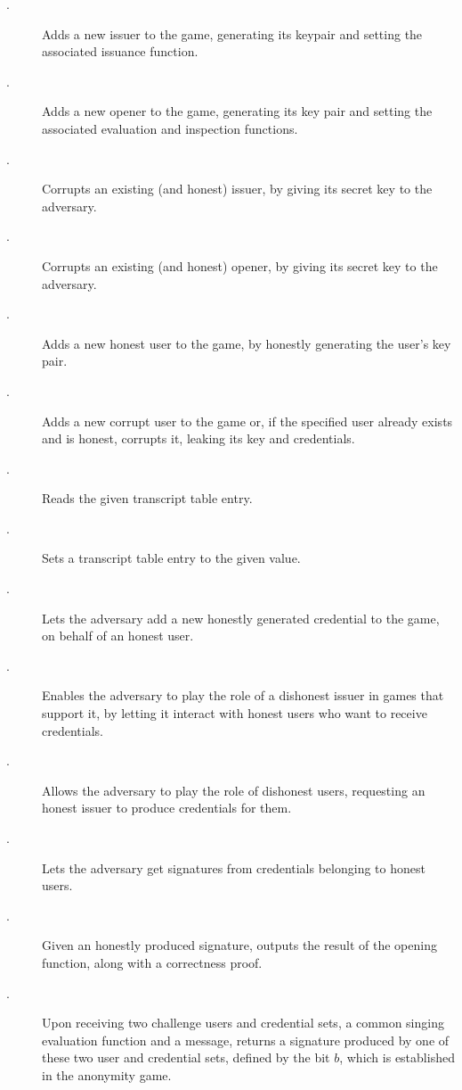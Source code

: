 \begin{description}
\item[\IGEN.] Adds a new issuer to the game, generating its keypair and setting
  the associated issuance function.
\item[\OGEN.] Adds a new opener to the game, generating its key pair and
  setting the associated evaluation and inspection functions.
\item[\ICORR.] Corrupts an existing (and honest) issuer, by giving its secret
  key to the adversary.
\item[\OCORR.] Corrupts an existing (and honest) opener, by giving its secret
  key to the adversary.  
\item[\HUGEN.] Adds a new honest user to the game, by honestly generating
  the user's key pair.
\item[\CUGEN.] Adds a new corrupt user to the game or, if the specified
  user already exists and is honest, corrupts it, leaking its key and
  credentials.
\item[\RREG.] Reads the given transcript table entry.
\item[\WREG.] Sets a transcript table entry to the given value.
\item[\OBTISS.] Lets the adversary add a new honestly generated credential to
  the game, on behalf of an honest user.
\item[\OBTAIN.] Enables the adversary to play the role of a dishonest issuer
  in games that support it, by letting it interact with honest users who want to
  receive credentials.
\item[\ISSUE.] Allows the adversary to play the role of dishonest users,
  requesting an honest issuer to produce credentials for them.
\item[\SIGN.] Lets the adversary get signatures from credentials belonging
  to honest users.
\item[\OPEN.] Given an honestly produced signature, outputs the result of the
  opening function, along with a correctness proof.
\item[\CHALb.] Upon receiving two challenge users and credential sets, a common
  singing evaluation function and a message, returns a signature produced by one
  of these two user and credential sets, defined by the bit $b$, which is
  established in the anonymity game.
\end{description}

